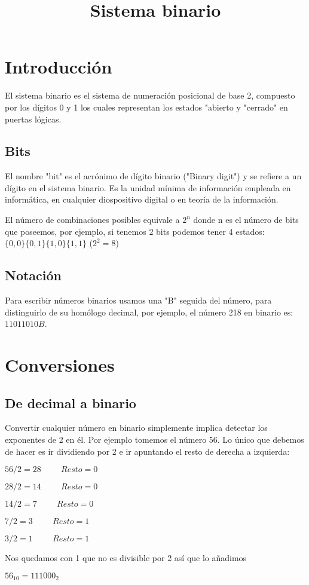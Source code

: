 \documentclass{article}
\title{Sistema binario}
\author{}
\date{}
\begin{document}
\maketitle
\thispagestyle{empty}  %

\section{Introducción}
El sistema binario es el sistema de numeración posicional de base 2, compuesto por los dígitos 0 y 1 los cuales representan los estados "abierto y "cerrado" en puertas lógicas.

\subsection{Bits}
El nombre "bit" es el acrónimo de dígito binario ("Binary digit") y se refiere a un dígito en el sistema binario. Es la unidad mínima de información empleada en informática, en cualquier diospositivo digital o en teoría de la información.

El número de combinaciones posibles equivale a $2^n$ donde n es el número de bits que poseemos, por ejemplo, si tenemos 2 bits podemos tener 4 estados: $\{0,0\} \{0,1\} \{1,0\} \{1,1\}$  ($2^2 = 8$)

\subsection{Notación}
Para escribir números binarios usamos una "B" seguida del número, para distinguirlo de su homólogo decimal, por ejemplo, el número 218 en binario es: $11011010B$.

\section{Conversiones}
\subsection{De decimal a binario}
Convertir cualquier número en binario simplemente implica detectar los exponentes de 2 en él. Por ejemplo tomemos el número 56. Lo único que debemos de hacer es ir dividiendo por 2 e ir apuntando el resto de derecha a izquierda:
\begin{center}
$56/2 = 28 \hspace{1cm} Resto = 0$

$28/2 = 14 \hspace{1cm} Resto = 0$

$14/2 = 7 \hspace{1cm} Resto = 0$

$7/2 = 3 \hspace{1cm} Resto = 1$

$3/2 = 1 \hspace{1cm} Resto = 1$

Nos quedamos con 1 que no es divisible por 2 así que lo añadimos

$56_{10} = 111000_2$
\end{center}
\end{document}
